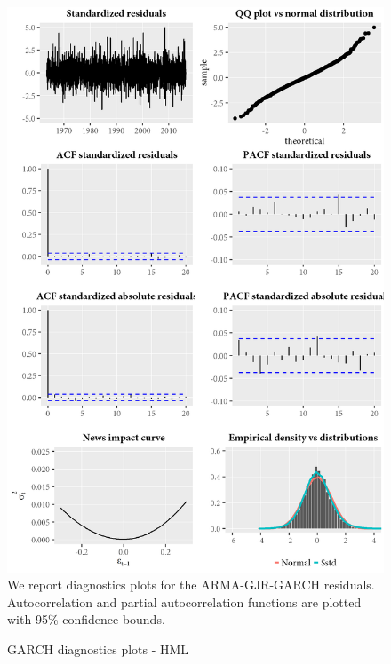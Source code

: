 \begin{figure}[H]
  \caption{GARCH diagnostics plots - HML}
  \label{diag:garchdiagHML}
  \centering
  \begin{minipage}{\textwidth}
  \includegraphics[scale=1]{graphics/garch/garch_diagnosticsHML.png}  
  \vspace{3mm}
  \footnotesize
  We report diagnostics plots for the ARMA-GJR-GARCH residuals. Autocorrelation and partial autocorrelation functions are plotted with 95\% confidence bounds.
  \end{minipage}
\end{figure}
